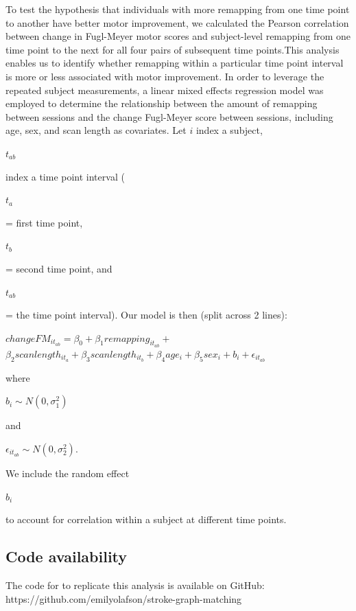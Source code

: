 \documentclass[phd,tocprelim]{cornell}
\begin{document}
	To test the hypothesis that individuals with more remapping from one time point to another have better motor improvement, we calculated the Pearson correlation between change in Fugl-Meyer motor scores and subject-level remapping from one time point to the next for all four pairs of subsequent time points.This analysis enables us to identify whether remapping within a particular time point interval is more or less associated with motor improvement. In order to leverage the repeated subject measurements, a linear mixed effects regression model was employed to determine the relationship between the amount of remapping between sessions and the change Fugl-Meyer score between sessions, including age, sex, and scan length as covariates.  Let $i$ index a subject, \begin{Large}$t_{ab}$\end{Large} index a time point interval (\begin{Large}$t_a$\end{Large} = first time point, \begin{Large}$t_b$\end{Large} = second time point, and  \begin{Large}$t_{ab}$\end{Large} = the time point interval). Our model is then (split across 2 lines): 
	
	\begin{Large}
	\begin{center}

	$changeFM_{it_{ab}} =  \beta_0 + \beta_1 remapping_{it_{ab}} + $
	$ \beta_2 scan length_{it_a} +\beta_3 scan length_{it_b} + \beta_4 age_i + \beta_5 sex_i + b_i + \epsilon_{it_{ab}}$

	\end{center}
	\end{Large}
	\noindent where \begin{Large}$b_i \sim N(0, \sigma_1^2)$ \end{Large} and \begin{Large}$\epsilon_{it_{ab}} \sim N(0, \sigma_2^2)$.\end{Large}  We include the random effect \begin{Large}$b_i$\end{Large} to account for correlation within a subject at different time points. 

	\subsection{Code availability}
	 The code for to replicate this analysis is available on GitHub: https://github.com/emilyolafson/stroke-graph-matching
	
\end{document}
